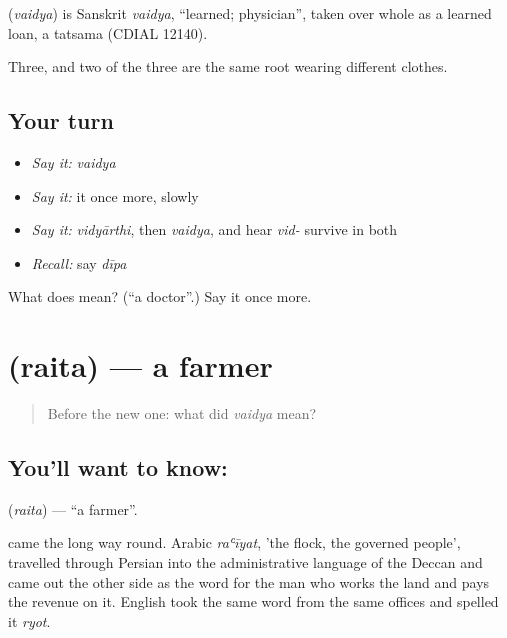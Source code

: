 \begin{cousinweb}
\textbf{} (\emph{vaidya}) is Sanskrit \emph{vaidya}, \textquotedblleft{}learned; physician\textquotedblright{}, taken over whole as a learned loan, a tatsama (CDIAL 12140).
\end{cousinweb}

\begin{grammarlens}[title={What you've built}]
Three, and two of the three are the same root wearing different clothes.
\end{grammarlens}

\subsection*{Your turn}
\begin{itemize}
\raggedright
  \item \emph{Say it:} \emph{vaidya}
  \item \emph{Say it:} it once more, slowly
  \item \emph{Say it:} \emph{vidyārthi}, then \emph{vaidya}, and hear \emph{vid-} survive in both
  \item \emph{Recall:} say \emph{dīpa}
\end{itemize}

\begin{tcolorbox}[breakable,colback=teal!4,colframe=teal!35!black,title={Before you move on}]
What does  mean? (\textquotedblleft{}a doctor\textquotedblright{}.) Say it once more.
\end{tcolorbox}
\section[\texorpdfstring{\kn{ರೈತ} (raita)}{ರೈತ (raita)}]{ (raita) — a farmer}

\label{lesson:KA-C48-farmer}



\begin{quote}
Before the new one: what did \emph{vaidya} mean?
\end{quote}

\subsection*{You'll want to know: }
\textbf{} (\emph{raita}) — \textquotedblleft{}a farmer\textquotedblright{}.

 came the long way round. Arabic \emph{raʿīyat}, 'the flock, the governed people', travelled through Persian into the administrative language of the Deccan and came out the other side as the word for the man who works the land and pays the revenue on it. English took the same word from the same offices and spelled it \emph{ryot}.

